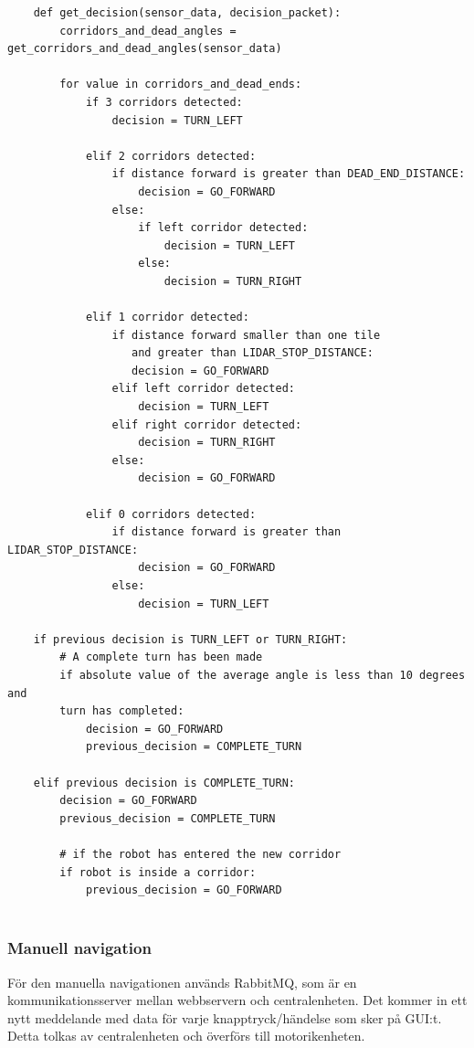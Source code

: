\documentclass[a4paper,titlepage,12pt]{article}
\begin{document}
    \begin{lstlisting}
    def get_decision(sensor_data, decision_packet):
        corridors_and_dead_angles = get_corridors_and_dead_angles(sensor_data)

        for value in corridors_and_dead_ends:
            if 3 corridors detected:
                decision = TURN_LEFT
            
            elif 2 corridors detected:
                if distance forward is greater than DEAD_END_DISTANCE:
                    decision = GO_FORWARD
                else:
                    if left corridor detected:
                        decision = TURN_LEFT
                    else:
                        decision = TURN_RIGHT
            
            elif 1 corridor detected:
                if distance forward smaller than one tile 
                   and greater than LIDAR_STOP_DISTANCE:
                   decision = GO_FORWARD
                elif left corridor detected:
                    decision = TURN_LEFT
                elif right corridor detected:
                    decision = TURN_RIGHT
                else:
                    decision = GO_FORWARD

            elif 0 corridors detected:
                if distance forward is greater than LIDAR_STOP_DISTANCE:
                    decision = GO_FORWARD
                else:
                    decision = TURN_LEFT
    
    if previous decision is TURN_LEFT or TURN_RIGHT:
        # A complete turn has been made
        if absolute value of the average angle is less than 10 degrees and
        turn has completed:
            decision = GO_FORWARD
            previous_decision = COMPLETE_TURN

    elif previous decision is COMPLETE_TURN:
        decision = GO_FORWARD
        previous_decision = COMPLETE_TURN
        
        # if the robot has entered the new corridor
        if robot is inside a corridor:
            previous_decision = GO_FORWARD
        
    \end{lstlisting}
    
    \subsubsection{Manuell navigation}
    För den manuella navigationen används RabbitMQ, som är en kommunikationsserver 
    mellan webbservern
    och centralenheten. Det kommer in ett nytt meddelande med data för varje
    knapptryck/händelse som sker på GUI:t. Detta tolkas av centralenheten och
    överförs till motorikenheten.
\end{document}
